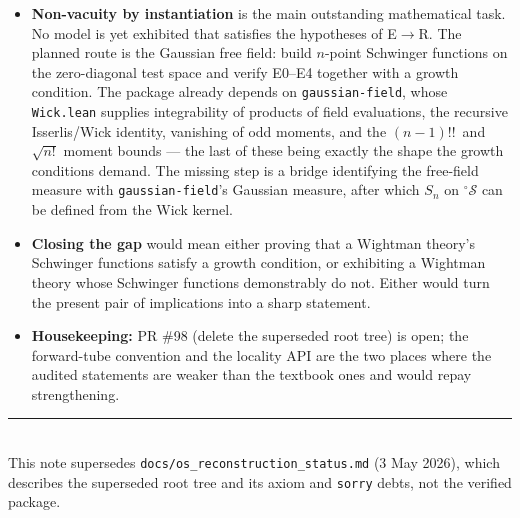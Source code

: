 \documentclass[11pt,a4paper]{article}
\newcommand{\lean}[1]{\texttt{#1}}
\begin{document}
\begin{itemize}[leftmargin=1.6em,itemsep=4pt]
\item \textbf{Non-vacuity by instantiation} is the main outstanding mathematical
task. No model is yet exhibited that satisfies the hypotheses of E$\to$R. The
planned route is the Gaussian free field: build $n$-point Schwinger functions on
the zero-diagonal test space and verify E0--E4 together with a growth condition.
The package already depends on \lean{gaussian-field}, whose \lean{Wick.lean}
supplies integrability of products of field evaluations, the recursive
Isserlis/Wick identity, vanishing of odd moments, and the
$(n-1)!!\,$ and $\sqrt{n!}$ moment bounds --- the last of these being exactly the
shape the growth conditions demand. The missing step is a bridge identifying the
free-field measure with \lean{gaussian-field}'s Gaussian measure, after which
$S_n$ on $^{\circ}\mathcal{S}$ can be defined from the Wick kernel.
\item \textbf{Closing the gap} would mean either proving that a Wightman theory's
Schwinger functions satisfy a growth condition, or exhibiting a Wightman theory
whose Schwinger functions demonstrably do not. Either would turn the present
pair of implications into a sharp statement.
\item \textbf{Housekeeping:} PR \#98 (delete the superseded root tree) is open;
the forward-tube convention and the locality API are the two places where the
audited statements are weaker than the textbook ones and would repay
strengthening.
\end{itemize}

\vfill
\noindent\rule{\linewidth}{0.4pt}\\
{\small This note supersedes \lean{docs/os\_reconstruction\_status.md} (3 May 2026),
which describes the superseded root tree and its axiom and \lean{sorry} debts, not
the verified package.}
\end{document}
